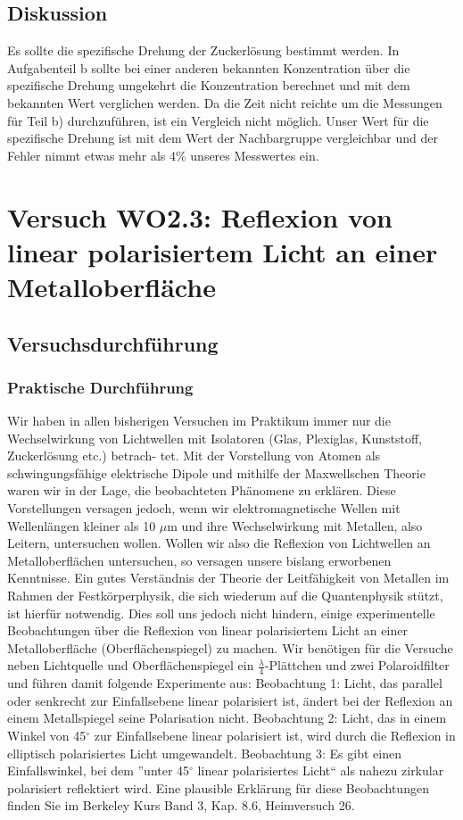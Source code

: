 \documentclass[12pt]{scrartcl}
\begin{document}
\subsection{Diskussion}
Es sollte die spezifische Drehung der Zuckerlösung bestimmt werden. In Aufgabenteil b sollte bei einer anderen bekannten Konzentration über die spezifische Drehung umgekehrt die Konzentration berechnet und mit dem bekannten Wert verglichen werden. Da die Zeit nicht reichte um die Messungen für Teil b) durchzuführen, ist ein Vergleich nicht möglich. Unser Wert für die  spezifische Drehung ist mit dem Wert der Nachbargruppe vergleichbar und der Fehler nimmt etwas mehr als 4\% unseres Messwertes ein.

\section{Versuch WO2.3:
Reflexion von linear polarisiertem Licht an einer Metalloberfläche}
\subsection{Versuchsdurchführung}

\subsubsection{Praktische Durchführung}
Wir haben in allen bisherigen Versuchen im Praktikum immer nur die Wechselwirkung
von Lichtwellen mit Isolatoren (Glas, Plexiglas, Kunststoff, Zuckerlösung etc.) betrach-
tet. Mit der Vorstellung von Atomen als schwingungsfähige elektrische Dipole und mithilfe der Maxwellschen Theorie waren wir in der Lage, die beobachteten Phänomene zu erklären. Diese Vorstellungen versagen jedoch, wenn wir elektromagnetische Wellen mit Wellenlängen kleiner als 10 $\mu$m und ihre Wechselwirkung mit Metallen, also Leitern, untersuchen wollen. Wollen wir also die Reflexion von Lichtwellen an Metalloberflächen untersuchen, so versagen unsere bislang erworbenen Kenntnisse. Ein gutes Verständnis der Theorie der Leitfähigkeit von Metallen im Rahmen der Festkörperphysik, die sich wiederum auf die Quantenphysik stützt, ist hierfür notwendig. Dies soll uns jedoch nicht hindern, einige experimentelle Beobachtungen über die Reflexion von linear polarisiertem Licht an einer Metalloberfläche (Oberflächenspiegel) zu machen. Wir benötigen für die Versuche neben Lichtquelle und Oberflächenspiegel ein
$\frac{\lambda}{4}$-Plättchen und zwei Polaroidfilter und
führen damit folgende Experimente aus:
Beobachtung 1: Licht, das parallel oder senkrecht zur Einfallsebene linear polarisiert ist, ändert bei der Reflexion an einem Metallspiegel seine Polarisation nicht.
Beobachtung 2: Licht, das in einem Winkel von 45$^\circ$ zur Einfallsebene linear polarisiert ist, wird durch die Reflexion in elliptisch polarisiertes Licht umgewandelt.
Beobachtung 3: Es gibt einen Einfallswinkel, bei dem
”unter 45$^\circ$
linear polarisiertes
Licht“ als nahezu zirkular polarisiert reflektiert wird.
Eine plausible Erklärung für diese Beobachtungen finden Sie im Berkeley Kurs Band 3, Kap. 8.6, Heimversuch 26.
\end{document}

